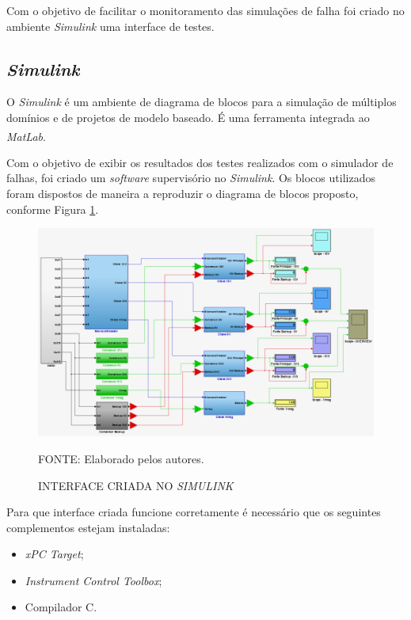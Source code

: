 \documentclass[
	12pt,				%
	openright,			%
	oneside,			%
	a4paper,			%
	english,			%
	french,				%
	spanish,			%
	brazil,				%
	oldfontcommands
	]{abntex2}
\begin{document}
	Com o objetivo de facilitar o monitoramento das simulações de falha foi criado no ambiente \textit{Simulink} uma interface de testes.
	
\subsection[Simulink]{\textit{Simulink}}

	O \textit{Simulink} é um ambiente de diagrama de blocos para a simulação de múltiplos domínios e de projetos de modelo baseado. É uma ferramenta integrada ao \textit{MatLab}.\textsuperscript{\cite{Simulink}}
	
	Com o objetivo de exibir os resultados dos testes realizados com o simulador de falhas, foi criado um \textit{software} supervisório no \textit{Simulink}. Os blocos utilizados foram dispostos de maneira a reproduzir o diagrama de blocos proposto, conforme Figura \ref{Fig_int}.
	
	\begin{figure}[th]
		\caption{INTERFACE CRIADA NO \textit{SIMULINK}}
		\label{Fig_int}
		\centering
		\includegraphics[width=1.0\linewidth]{./figs/int}
			
		\begin{small}
			FONTE: Elaborado pelos autores.
		\end{small}		
	\end{figure}
	
	Para que interface criada funcione corretamente é necessário que os seguintes complementos estejam instaladas:
	
	\begin{itemize}
		\item \textit{xPC Target};
		\item \textit{Instrument Control Toolbox};
		\item Compilador C.
	\end{itemize}
\end{document}
